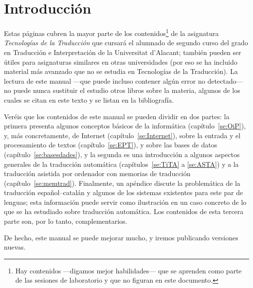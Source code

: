 \chapter{Introducción} 

Estas páginas cubren la mayor parte de los contenidos\footnote{Hay contenidos ---digamos mejor habilidades--- que se aprenden como parte de las sesiones de laboratorio y que no figuran en este documento.} de la asignatura \emph{Tecnologías de la Traducción} que cursará el alumnado de segundo curso del grado en Traducción e Interpretación de la Universitat d'Alacant; también pueden ser útiles para asignaturas similares en otras universidades (por eso se  ha incluido material más avanzado que no se estudia en Tecnologías de la Traducción). La lectura de este manual ---que puede incluso contener algún error no detectado--- no puede nunca sustituir el estudio otros libros sobre la materia, algunos de los cuales se citan en este texto y se listan en la bibliografía. 

Veréis que los contenidos de este manual se pueden dividir en dos partes: la primera presenta algunos conceptos básicos de la informática (capítulo~\ref{se:OiP}), y, más concretamente, de Internet (capítulo~\ref{se:Internet}), sobre la entrada y el procesamiento de textos (capítulo~\ref{se:EPT}), y sobre las bases de datos (capítulo~\ref{se:basesdades}), y la segunda es una introducción a algunos aspectos generales de la traducción automática (capítulos~\ref{se:TiTA} a \ref{se:ASTA}) y a la traducción asistida por ordenador con memorias de traducción (capítulo~\ref{se:memtrad}). Finalmente, un apéndice discute la problemática de la traducción español--catalán y algunos de los sistemas existentes para este par de lenguas; esta información puede servir como ilustración en un caso concreto de lo que se ha estudiado sobre traducción automática. Los contenidos de esta tercera parte son, por lo tanto, complementarios. 

De hecho, este manual se puede mejorar mucho, y  iremos publicando versiones nuevas. 

